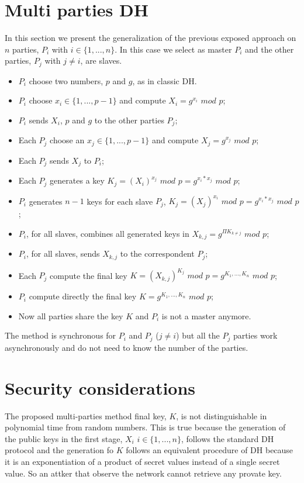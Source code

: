 \documentclass[11pt]{article}
\begin{document}
\section{Multi parties DH}

In this section we present the generalization of the previous exposed approach on $n$ parties, $P_i$ with $i \in \{1, ..., n\}$. In this case we select as master $P_i$ and the other parties, $P_j$ with $j \neq i$, are slaves.

\begin{itemize}
    \item $P_i$ choose two numbers, $p$ and $g$, as in classic DH.
    \item $P_i$ choose $x_i \in \{1, ..., p-1\}$ and compute $X_i = g^{x_i}$ $mod$ $p$;
    \item $P_i$ sends $X_i$, $p$ and $g$ to the other parties $P_j$;
    \item Each $P_j$ choose an $x_j \in \{1, ..., p-1\}$ and compute $X_j = g^{x_j}$ $mod$ $p$;
    \item Each $P_j$ sends $X_j$ to $P_i$;
    \item Each $P_j$ generates a key $K_j = (X_i)^{x_j}$ $mod$ $p = g^{x_i*x_j}$ $mod$ $p$;
    \item $P_i$ generates $n-1$ keys for each slave $P_j$, $K_j = (X_j)^{x_i}$ $mod$ $p = g^{x_i*x_j}$ $mod$ $p$;
    \item $P_i$, for all slaves, combines all generated keys in $X_{k,j} = g^{\Pi K_{k \neq j} }$ $mod$ $p$;
    \item $P_i$, for all slaves, sends $X_{k,j}$ to the correspondent $P_j$;
    \item Each $P_j$ compute the final key $K = (X_{k,j})^{K_j}$ $mod$ $p = g^{K_1,...,K_n}$ $mod$ $p$;
    \item $P_i$ compute directly the final key $K = g^{K_1,...,K_n}$ $mod$ $p$;
    \item Now all parties share the key $K$ and $P_i$ is not a master anymore.
\end{itemize}

The method is synchronous for $P_i$ and $P_j$ ($j \neq i$) but all the $P_j$ parties work asynchronously and do not need to know the number of the parties.

\section{Security considerations}

The proposed multi-parties method final key, $K$, is not distinguishable in polynomial time from random numbers. This is true because the generation of the public keys in the first stage, $X_i$ $i \in \{1, ..., n\}$, follows the standard DH protocol and the generation fo $K$ follows an equivalent procedure of DH because it is an exponentiation of a product of secret values instead of a single secret value.
So an attker that observe the network cannot retrieve any provate key.
\end{document}
